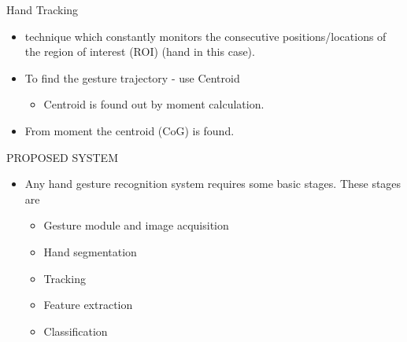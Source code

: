 \documentclass{beamer}
\begin{document}
\begin{frame}{Hand Tracking}
\begin{itemize}
\item technique which
constantly monitors the consecutive positions/locations of the
region of interest (ROI) (hand in this case). 
\linebreak
\item To find the
gesture trajectory - use Centroid
 
\begin{itemize}
\item Centroid is found out by moment calculation.
\end{itemize}
\vspace{0.5 cm}
\item From moment the centroid (CoG) is found.
\end{itemize}
\end{frame}


\begin{frame}{PROPOSED SYSTEM}
\vspace{0.5cm}
 \begin{itemize}
\item Any hand gesture recognition system requires some basic
stages. These stages are
\vspace{.5 cm}
 \begin{itemize}
\item Gesture module and image acquisition
\item Hand segmentation
\item Tracking
\item \alert{Feature extraction}
\item Classification

\end{itemize}
\end{itemize}
\end{frame} 
\end{document}
